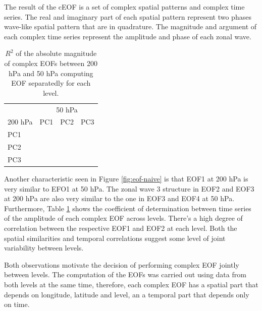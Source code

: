 \documentclass[smallextended]{svjour3}       %
\begin{document}
The result of the cEOF is a set of complex spatial patterns and complex time series. The real and imaginary part of each spatial pattern represent two phases wave-like spatial pattern that are in quadrature. The magnitude and argument of each complex time series represent the amplitude and phase of each zonal wave.

\begin{table}

\caption{\label{tab:corr-ceof-splitted}$R^2$ of the absolute magnitude of complex EOFs between 200 hPa and 50 hPa computing EOF separatedly for each level.}
\centering
\begin{tabular}[t]{l>{}r>{}r>{}r}
\toprule
\multicolumn{1}{c}{} & \multicolumn{3}{c}{50 hPa} \\
\cmidrule(l{3pt}r{3pt}){2-4}
200 hPa & PC1 & PC2 & PC3\\
\midrule
PC1 & \cellcolor[HTML]{E1C0BB}{\textcolor{black}{0.28}} & \cellcolor[HTML]{FDFAFA}{\textcolor{black}{0.02}} & \cellcolor[HTML]{FDFAFA}{\textcolor{black}{0.02}}\\
PC2 & \cellcolor[HTML]{FFFFFF}{\textcolor{black}{0.00}} & \cellcolor[HTML]{BB7A73}{\textcolor{white}{0.60}} & \cellcolor[HTML]{FDFAFA}{\textcolor{black}{0.02}}\\
PC3 & \cellcolor[HTML]{FFFFFF}{\textcolor{black}{0.00}} & \cellcolor[HTML]{FFFFFF}{\textcolor{black}{0.00}} & \cellcolor[HTML]{FDFCFC}{\textcolor{black}{0.01}}\\
\bottomrule
\end{tabular}
\end{table}

Another characteristic seen in Figure \ref{fig:eof-naive} is that EOF1 at 200 hPa is very similar to EFO1 at 50 hPa. The zonal wave 3 structure in EOF2 and EOF3 at 200 hPa are also very similar to the one in EOF3 and EOF4 at 50 hPa. Furthermore, Table \ref{tab:corr-ceof-splitted} shows the coefficient of determination between time series of the amplitude of each complex EOF across levels. There's a high degree of correlation between the respective EOF1 and EOF2 at each level. Both the spatial similarities and temporal correlations suggest some level of joint variability between levels.

Both observations motivate the decision of performing complex EOF jointly between levels. The computation of the EOFs was carried out using data from both levels at the same time, therefore, each complex EOF has a spatial part that depends on longitude, latitude and level, an a temporal part that depends only on time.
\end{document}
